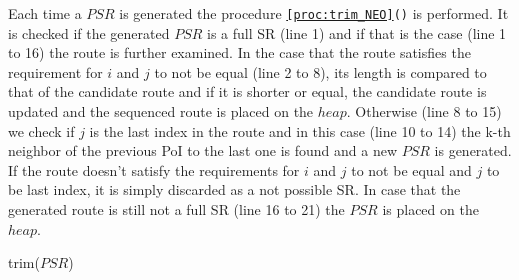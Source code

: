 \pagebreak

Each time a $PSR$ is generated the procedure \texttt{\ref{proc:trim_NEO}()} is performed. It is checked if the generated $PSR$ is a full SR (line 1) and if that is the case (line 1 to 16) the route is further examined. In the case that the route satisfies the requirement for $i$ and $j$ to not be equal (line 2 to 8), its length is compared to that of the candidate route and if it is shorter or equal, the candidate route is updated and the sequenced route is placed on the $heap$. Otherwise (line 8 to 15) we check if $j$ is the last index in the route and in this case (line 10 to 14) the k-th neighbor of the previous PoI to the last one is found and a new $PSR$ is generated. If the route doesn't satisfy the requirements for $i$ and $j$ to not be equal and $j$ to be last index, it is simply discarded as a not possible SR. In case that the generated route is still not a full SR (line 16 to 21) the $PSR$ is placed on the $heap$. \newline

\begin{procedure}[H]
\caption{trim($PSR$)}
\label{proc:trim_NEO}
	
\end{procedure}

